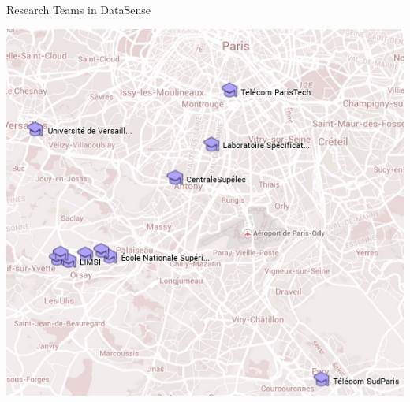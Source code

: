 \begin{frame}{Research Teams in DataSense}

  \begin{center}
    \includegraphics[width=.7\linewidth]{Images/datasense-locations.png}%
  \end{center}

\end{frame}

